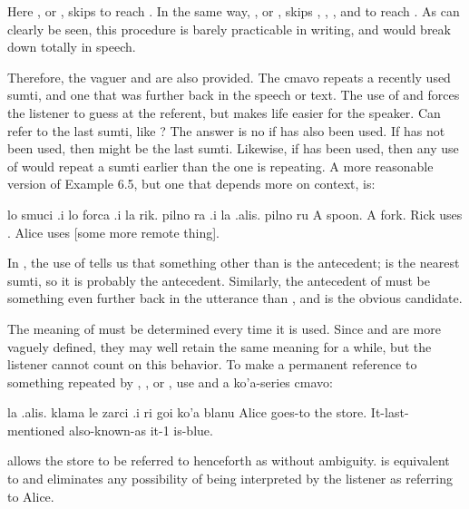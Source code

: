 Here , or , skips  to reach
    . In the same way, , or ,
    skips , , , and 
    to reach . As can clearly be seen, this procedure
    is barely practicable in writing, and would break down totally
    in speech.

Therefore, the vaguer  and  are also provided.
    The cmavo  repeats a recently used sumti, and  one
    that was further back in the speech or text. The use of 
    and  forces the listener to guess at the referent, but
    makes life easier for the speaker. Can  refer to the last
    sumti, like ? The answer is no if  has also been
    used. If  has not been used, then  might be the
    last sumti. Likewise, if  has been used, then any use of
     would repeat a sumti earlier than the one  is
    repeating. A more reasonable version of Example 6.5, but one
    that depends more on context, is:
\begin{example}
lo smuci .i lo forca .i la rik. pilno ra\n
\T	.i la .alis. pilno ru\n
A spoon.  A fork.  Rick uses .\n
\T	Alice uses [some more remote thing].
\end{example}

In , the use of  tells
    us that something other than  is the antecedent;
     is the nearest sumti, so it is probably the
    antecedent. Similarly, the antecedent of  must be
    something even further back in the utterance than ,
    and  is the obvious candidate.

The meaning of  must be determined every time it is
    used. Since  and  are more vaguely defined, they
    may well retain the same meaning for a while, but the listener
    cannot count on this behavior. To make a permanent reference to
    something repeated by , , or , use 
    and a ko'a-series cmavo:
\begin{example}
la .alis. klama le zarci\n
\T	.i ri goi ko'a blanu\n
Alice goes-to the store.\n
\T	It-last-mentioned also-known-as it-1 is-blue.
\end{example}

{\noindent}allows the store to be referred to henceforth as 
    without ambiguity.  is
    equivalent to  and eliminates
    any possibility of  being interpreted by the listener
    as referring to Alice. 

